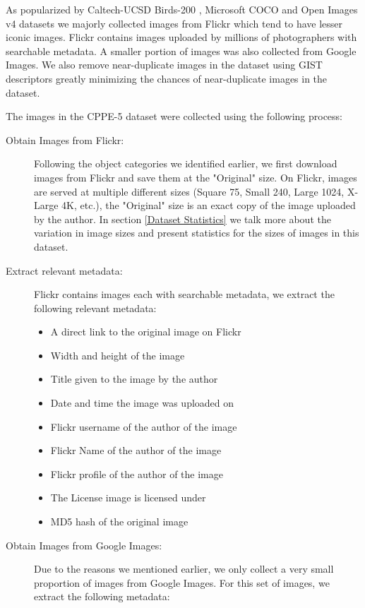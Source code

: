 \documentclass{article}
\begin{document}
As popularized by Caltech-UCSD Birds-200 \cite{wah2011caltech, welinder2010caltech}, Microsoft COCO \cite{lin2014microsoft} and Open Images v4 \cite{kuznetsova2020} datasets we majorly collected images from Flickr which tend to have lesser iconic images. Flickr contains images uploaded by millions of photographers with searchable metadata. A smaller portion of images was also collected from Google Images. We also remove near-duplicate images in the dataset using GIST descriptors \cite{10.1145/1646396.1646421, murillo2012localization} greatly minimizing the chances of near-duplicate images in the dataset.

The images in the CPPE-5 dataset were collected using the following process:

\begin{description}
   \item[Obtain Images from Flickr:] Following the object categories we identified earlier, we first download images from Flickr and save them at the "Original" size. On Flickr, images are served at multiple different sizes (Square 75, Small 240, Large 1024, X-Large 4K, etc.), the "Original" size is an exact copy of the image uploaded by the author. In section \ref{Dataset Statistics} we talk more about the variation in image sizes and present statistics for the sizes of images in this dataset.
   \item[Extract relevant metadata:] Flickr contains images each with searchable metadata, we extract the following relevant metadata:
    \begin{itemize}
     \item A direct link to the original image on Flickr
     \item Width and height of the image
     \item Title given to the image by the author
     \item Date and time the image was uploaded on
     \item Flickr username of the author of the image
     \item Flickr Name of the author of the image
     \item Flickr profile of the author of the image
     \item The License image is licensed under
     \item MD5 hash of the original image
    \end{itemize}
   \item[Obtain Images from Google Images:] Due to the reasons we mentioned earlier, we only collect a very small proportion of images from Google Images. For this set of images, we extract the following metadata:

\end{description}
\end{document}
